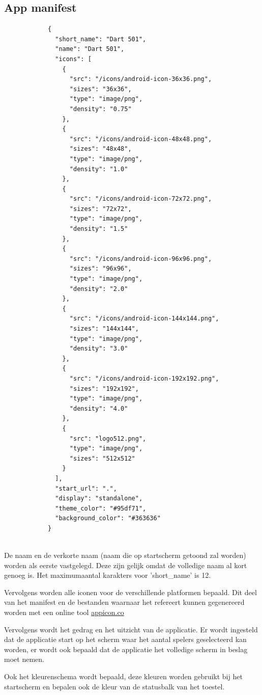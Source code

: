 	\subsection{App manifest}
		\begin{lstlisting}
			{
			  "short_name": "Dart 501",
			  "name": "Dart 501",
			  "icons": [
			    {
			      "src": "/icons/android-icon-36x36.png",
			      "sizes": "36x36",
			      "type": "image/png",
			      "density": "0.75"
			    },
			    {
			      "src": "/icons/android-icon-48x48.png",
			      "sizes": "48x48",
			      "type": "image/png",
			      "density": "1.0"
			    },
			    {
			      "src": "/icons/android-icon-72x72.png",
			      "sizes": "72x72",
			      "type": "image/png",
			      "density": "1.5"
			    },
			    {
			      "src": "/icons/android-icon-96x96.png",
			      "sizes": "96x96",
			      "type": "image/png",
			      "density": "2.0"
			    },
			    {
			      "src": "/icons/android-icon-144x144.png",
			      "sizes": "144x144",
			      "type": "image/png",
			      "density": "3.0"
			    },
			    {
			      "src": "/icons/android-icon-192x192.png",
			      "sizes": "192x192",
			      "type": "image/png",
			      "density": "4.0"
			    },
			    {
			      "src": "logo512.png",
			      "type": "image/png",
			      "sizes": "512x512"
			    }
			  ],
			  "start_url": ".",
			  "display": "standalone",
			  "theme_color": "#95df71",
			  "background_color": "#363636"
			}
			
		\end{lstlisting}
		
		De naam en de verkorte naam (naam die op startscherm getoond zal worden) worden als eerste vastgelegd. Deze zijn gelijk omdat de volledige naam al kort genoeg is. Het maximumaantal karakters voor 'short\_name' is 12.
 
		
		Vervolgens worden alle iconen voor de verschillende platformen bepaald. Dit deel van het manifest en de bestanden waarnaar het refereert kunnen gegenereerd worden met een online tool \href{https://appicon.co}{appicon.co}
		
		Vervolgens wordt het gedrag en het uitzicht van de applicatie. Er wordt ingesteld dat de applicatie start op het scherm waar het aantal spelers geselecteerd kan worden, er wordt ook bepaald dat de applicatie het volledige scherm in beslag moet nemen.
		
		Ook het kleurenschema wordt bepaald, deze kleuren worden gebruikt bij het startscherm en bepalen ook de kleur van de statusbalk van het toestel. 
		
